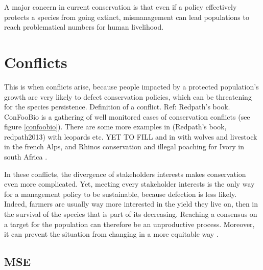 \documentclass[12pt,a4paper]{article}
\begin{document}
A major concern in current conservation is that even if a policy effectively protects a species from going extinct, mismanagement can lead populations to reach problematical numbers for human livelihood.

\section{Conflicts}

This is when conflicts arise, because people impacted by a protected population's growth are very likely to defect conservation policies, which can be threatening for the species persistence.
Definition of a conflict. Ref: Redpath's book.\\
ConFooBio is a gathering of well monitored cases of conservation conflicts (see figure \ref{confoobio}).
There are some more examples in (Redpath's book, redpath2013) with leopards etc. YET TO FILL
and in \cite{behr2017} with wolves and livestock in the french Alps, and Rhinos conservation and illegal poaching for Ivory in south Africa \citep{glynatsi2018evolutionary}.

In these conflicts, the divergence of stakeholders interests makes conservation even more complicated.
Yet, meeting every stakeholder interests is the only way for a management policy to be sustainable, because defection is less likely.
Indeed, farmers are usually way more interested in the yield they live on, then in the survival of the species that is part of its decreasing.
Reaching a consensus on a target for the population can therefore be an unproductive process.
Moreover, it can prevent the situation from changing in a more equitable way \citep{peterson2005conservation}.

\subsection{MSE}
\end{document}
